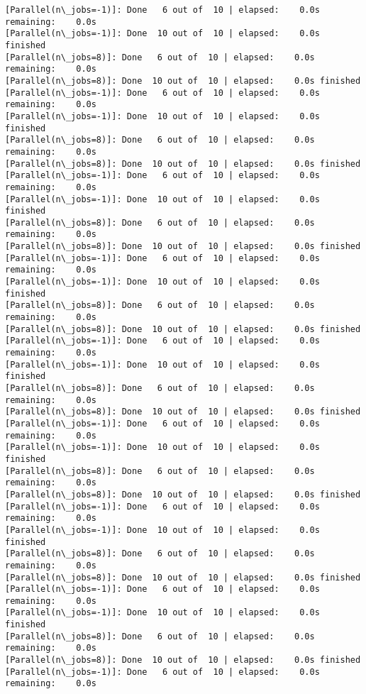 \documentclass[11pt]{article}
\begin{document}
    \begin{Verbatim}[commandchars=\\\{\}]
[Parallel(n\_jobs=-1)]: Done   6 out of  10 | elapsed:    0.0s remaining:    0.0s
[Parallel(n\_jobs=-1)]: Done  10 out of  10 | elapsed:    0.0s finished
[Parallel(n\_jobs=8)]: Done   6 out of  10 | elapsed:    0.0s remaining:    0.0s
[Parallel(n\_jobs=8)]: Done  10 out of  10 | elapsed:    0.0s finished
[Parallel(n\_jobs=-1)]: Done   6 out of  10 | elapsed:    0.0s remaining:    0.0s
[Parallel(n\_jobs=-1)]: Done  10 out of  10 | elapsed:    0.0s finished
[Parallel(n\_jobs=8)]: Done   6 out of  10 | elapsed:    0.0s remaining:    0.0s
[Parallel(n\_jobs=8)]: Done  10 out of  10 | elapsed:    0.0s finished
[Parallel(n\_jobs=-1)]: Done   6 out of  10 | elapsed:    0.0s remaining:    0.0s
[Parallel(n\_jobs=-1)]: Done  10 out of  10 | elapsed:    0.0s finished
[Parallel(n\_jobs=8)]: Done   6 out of  10 | elapsed:    0.0s remaining:    0.0s
[Parallel(n\_jobs=8)]: Done  10 out of  10 | elapsed:    0.0s finished
[Parallel(n\_jobs=-1)]: Done   6 out of  10 | elapsed:    0.0s remaining:    0.0s
[Parallel(n\_jobs=-1)]: Done  10 out of  10 | elapsed:    0.0s finished
[Parallel(n\_jobs=8)]: Done   6 out of  10 | elapsed:    0.0s remaining:    0.0s
[Parallel(n\_jobs=8)]: Done  10 out of  10 | elapsed:    0.0s finished
[Parallel(n\_jobs=-1)]: Done   6 out of  10 | elapsed:    0.0s remaining:    0.0s
[Parallel(n\_jobs=-1)]: Done  10 out of  10 | elapsed:    0.0s finished
[Parallel(n\_jobs=8)]: Done   6 out of  10 | elapsed:    0.0s remaining:    0.0s
[Parallel(n\_jobs=8)]: Done  10 out of  10 | elapsed:    0.0s finished
[Parallel(n\_jobs=-1)]: Done   6 out of  10 | elapsed:    0.0s remaining:    0.0s
[Parallel(n\_jobs=-1)]: Done  10 out of  10 | elapsed:    0.0s finished
[Parallel(n\_jobs=8)]: Done   6 out of  10 | elapsed:    0.0s remaining:    0.0s
[Parallel(n\_jobs=8)]: Done  10 out of  10 | elapsed:    0.0s finished
[Parallel(n\_jobs=-1)]: Done   6 out of  10 | elapsed:    0.0s remaining:    0.0s
[Parallel(n\_jobs=-1)]: Done  10 out of  10 | elapsed:    0.0s finished
[Parallel(n\_jobs=8)]: Done   6 out of  10 | elapsed:    0.0s remaining:    0.0s
[Parallel(n\_jobs=8)]: Done  10 out of  10 | elapsed:    0.0s finished
[Parallel(n\_jobs=-1)]: Done   6 out of  10 | elapsed:    0.0s remaining:    0.0s
[Parallel(n\_jobs=-1)]: Done  10 out of  10 | elapsed:    0.0s finished
[Parallel(n\_jobs=8)]: Done   6 out of  10 | elapsed:    0.0s remaining:    0.0s
[Parallel(n\_jobs=8)]: Done  10 out of  10 | elapsed:    0.0s finished
[Parallel(n\_jobs=-1)]: Done   6 out of  10 | elapsed:    0.0s remaining:    0.0s

\end{Verbatim}
\end{document}
